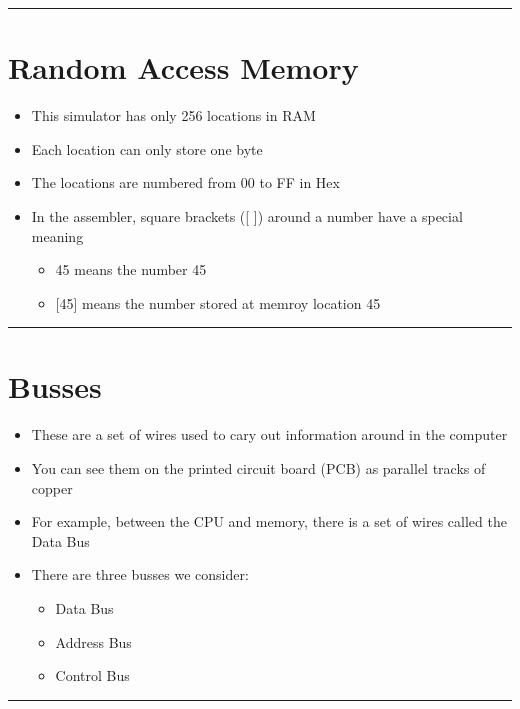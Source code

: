 \documentclass{article}
\begin{document}
  \begin{center}
    \rule{0.5\textwidth}{0.4pt}
  \end{center}
  \section{Random Access Memory}
  \begin{itemize}
    \item{This simulator has only 256 locations in RAM}
    \item{Each location can only store one byte}
    \item{The locations are numbered from 00 to FF in Hex}
    \item{In the assembler, square brackets ([ ]) around a number have a special meaning}
    \begin{itemize}
      \item{45 means the number 45}
      \item{[45] means the number stored at memroy location 45}
    \end{itemize}
  \end{itemize}

  \begin{center}
    \rule{.5\textwidth}{.4pt}
  \end{center}
  \section{Busses}
  \begin{itemize}
    \item{These are a set of wires used to cary out information around in the computer}
    \item{You can see them on the printed circuit board (PCB) as parallel tracks of copper}
    \item{For example, between the CPU and memory, there is a set of wires called the Data Bus}
    \item{There are three busses we consider:}
    \begin{itemize}
      \item{Data Bus}
      \item{Address Bus}
      \item{Control Bus}
    \end{itemize}
  \end{itemize}

  \begin{center}
    \rule{0.5\textwidth}{.4pt}
  \end{center}
\end{document}
